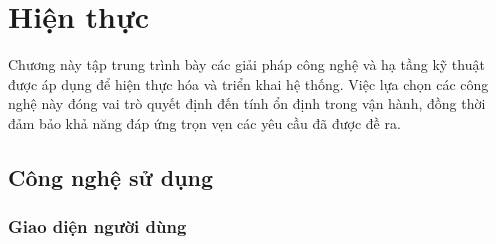 \section{Hiện thực}
Chương này tập trung trình bày các giải pháp công nghệ và hạ tầng kỹ thuật được áp dụng để hiện thực hóa và triển khai hệ thống. Việc lựa chọn các công nghệ này đóng vai trò quyết định đến tính ổn định trong vận hành, đồng thời đảm bảo khả năng đáp ứng trọn vẹn các yêu cầu đã được đề ra.

\subsection{Công nghệ sử dụng}
\subsubsection{Giao diện người dùng}

